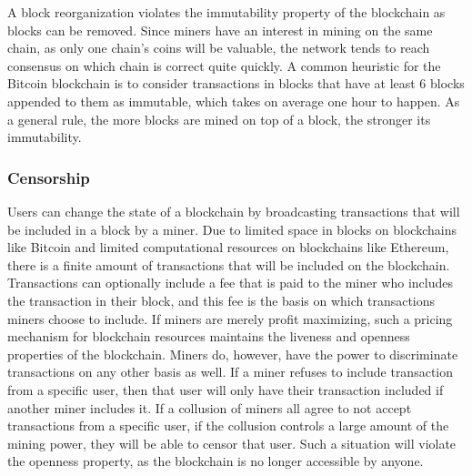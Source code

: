 A block reorganization violates the immutability property of the blockchain as blocks can be removed. Since miners have an interest in mining on the same chain, as only one chain's coins will be valuable, the network tends to reach consensus on which chain is correct quite quickly. A common heuristic for the Bitcoin blockchain is to consider transactions in blocks that have at least 6 blocks appended to them as immutable, which takes on average one hour to happen. As a general rule, the more blocks are mined on top of a block, the stronger its immutability. 


\subsubsection{Censorship}
Users can change the state of a blockchain by broadcasting transactions that will be included in a block by a miner. Due to limited space in blocks on blockchains like Bitcoin and limited computational resources on blockchains like Ethereum, there is a finite amount of transactions that will be included on the blockchain. Transactions can optionally include a fee that is paid to the miner who includes the transaction in their block, and this fee is the basis on which transactions miners choose to include. If miners are merely profit maximizing, such a pricing mechanism for blockchain resources maintains the liveness and openness properties of the blockchain. 
Miners do, however, have the power to discriminate transactions on any other basis as well. If a miner refuses to include transaction from a specific user, then that user will only have their transaction included if another miner includes it. If a collusion of miners all agree to not accept transactions from a specific user, if the collusion controls a large amount of the mining power, they will be able to censor that user. Such a situation will violate the openness property, as the blockchain is no longer accessible by anyone. 


